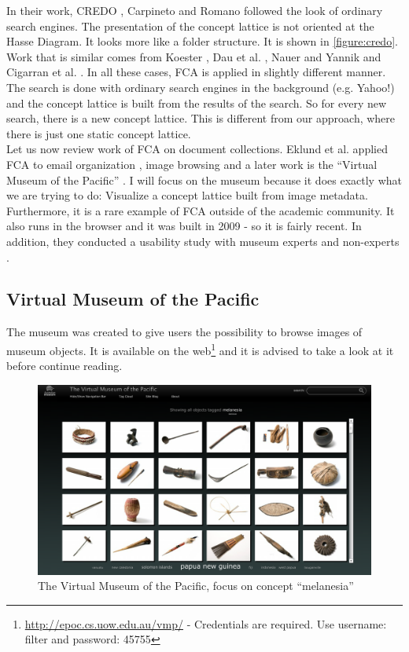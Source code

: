 \documentclass[11pt]{report}
\begin{document}
In their work, CREDO \cite{Carpineto2004}, Carpineto and Romano followed the look of ordinary search engines. The presentation of the concept lattice is not oriented at the Hasse Diagram. It looks more like a folder structure. It is shown in \ref{figure:credo}. Work that is similar comes from Koester \cite{Koester2006}, Dau et al. \cite{Dau2008}, Nauer and Yannik \cite{Nauer2009} and Cigarran et al. \cite{Cigarran2004}. In all these cases, FCA is applied in slightly different manner. The search is done with ordinary search engines in the background (e.g. Yahoo!) and the concept lattice is built from the results of the search. So for every new search, there is a new concept lattice. This is different from our approach, where there is just one static concept lattice. \\

Let us now review work of FCA on document collections. Eklund et al. applied FCA to email organization \cite{Eklund2004}, image browsing \cite{Ducrou2006,Ducrou2008} and a later work is the ``Virtual Museum of the Pacific'' \cite{Eklund2009,Eklund2012}. I will focus on the museum because it does exactly what we are trying to do: Visualize a concept lattice built from image metadata. Furthermore, it is a rare example of FCA outside of the academic community. It also runs in the browser and it was built in 2009 - so it is fairly recent. In addition, they conducted a usability study with museum experts and non-experts \cite{Eklund2012}.

\subsection{Virtual Museum of the Pacific}
\label{Museum}
 
The museum was created to give users the possibility to browse images of museum objects. It is available on the web\footnote{\url{http://epoc.cs.uow.edu.au/vmp/} - Credentials are required. Use username: filter and password: 45755} and it is advised to take a look at it before continue reading. \\

\begin{figure}[!ht]
	\centering
	\includegraphics[width=\linewidth]{images/pacific}
\caption{The Virtual Museum of the Pacific, focus on concept ``melanesia''}
\label{figure:pacific}
\end{figure}
\end{document}
